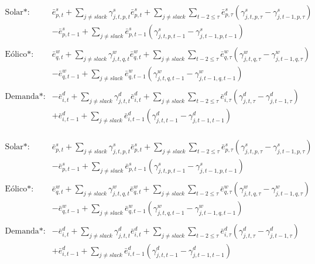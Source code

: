\begin{align*}
    \text{Solar*:} &  \bar{e}^{s}_{p,t} + \sum_{j\neq{slack}}\gamma^{s}_{j, t, p, t}\bar{e}^{s}_{p,t} + \sum_{j\neq{slack}}\sum_{t-2 \leqslant  \tau}\bar{e}^{s}_{p,\tau} \left ( \gamma^{s}_{j, t, p, \tau} - \gamma^{s}_{j, t-1, p, \tau} \right ) \\
    & - \bar{e}^{s}_{p,t-1} + \sum_{j\neq{slack}}\bar{e}^{s}_{p,t-1} \left ( \gamma^{s}_{j, t, p, t-1} - \gamma^{s}_{j, t-1, p, t-1} \right )\\
    & \\
    \text{Eólico*:} & \bar{e}^{w}_{q,t} + \sum_{j\neq{slack}}\gamma^{w}_{j, t, q, t} \bar{e}^{w}_{q,t} + \sum_{j\neq{slack}}\sum_{t-2 \leqslant  \tau}\bar{e}^{w}_{q,\tau}\left( \gamma^{w}_{j, t, q, \tau} - \gamma^{w}_{j, t-1, q, \tau} \right )\\
    & - \bar{e}^{w}_{q,t-1} + \sum_{j\neq{slack}}\bar{e}^{w}_{q,t-1}\left( \gamma^{w}_{j, t, q, t-1} - \gamma^{w}_{j, t-1, q, t-1} \right ) \\
    & \\
    \text{Demanda*:} & - \bar{e}^{d}_{i, t} + \sum_{j\neq{slack}}\gamma^{d}_{j, t,t}\bar{e}^{d}_{i,t} + \sum_{j\neq{slack}}\sum_{t-2 \leqslant  \tau}\bar{e}^{d}_{i,\tau}\left(\gamma^{d}_{j, t,\tau} - \gamma^{d}_{j, t-1,\tau} \right ) \\
    & + \bar{e}^{d}_{i, t-1} + \sum_{j\neq{slack}}\bar{e}^{d}_{i,t-1}\left(\gamma^{d}_{j, t,t-1} - \gamma^{d}_{j, t-1,t-1} \right ) \\
\end{align*}

\begin{align*}
    \text{Solar*:} &  \bar{e}^{s}_{p,t} + \sum_{j\neq{slack}}\gamma^{s}_{j, t, p, t}\bar{e}^{s}_{p,t} + \sum_{j\neq{slack}}\sum_{t-2 \leqslant  \tau}\bar{e}^{s}_{p,\tau} \left ( \gamma^{s}_{j, t, p, \tau} - \gamma^{s}_{j, t-1, p, \tau} \right ) \\
    & - \bar{e}^{s}_{p,t-1} + \sum_{j\neq{slack}}\bar{e}^{s}_{p,t-1} \left ( \gamma^{s}_{j, t, p, t-1} - \gamma^{s}_{j, t-1, p, t-1} \right )\\
    & \\
    \text{Eólico*:} & \bar{e}^{w}_{q,t} + \sum_{j\neq{slack}}\gamma^{w}_{j, t, q, t} \bar{e}^{w}_{q,t} + \sum_{j\neq{slack}}\sum_{t-2 \leqslant  \tau}\bar{e}^{w}_{q,\tau}\left( \gamma^{w}_{j, t, q, \tau} - \gamma^{w}_{j, t-1, q, \tau} \right )\\
    & - \bar{e}^{w}_{q,t-1} + \sum_{j\neq{slack}}\bar{e}^{w}_{q,t-1}\left( \gamma^{w}_{j, t, q, t-1} - \gamma^{w}_{j, t-1, q, t-1} \right ) \\
    & \\
    \text{Demanda*:} & - \bar{e}^{d}_{i, t} + \sum_{j\neq{slack}}\gamma^{d}_{j, t,t}\bar{e}^{d}_{i,t} + \sum_{j\neq{slack}}\sum_{t-2 \leqslant  \tau}\bar{e}^{d}_{i,\tau}\left(\gamma^{d}_{j, t,\tau} - \gamma^{d}_{j, t-1,\tau} \right ) \\
    & + \bar{e}^{d}_{i, t-1} + \sum_{j\neq{slack}}\bar{e}^{d}_{i,t-1}\left(\gamma^{d}_{j, t,t-1} - \gamma^{d}_{j, t-1,t-1} \right ) \\
\end{align*}

